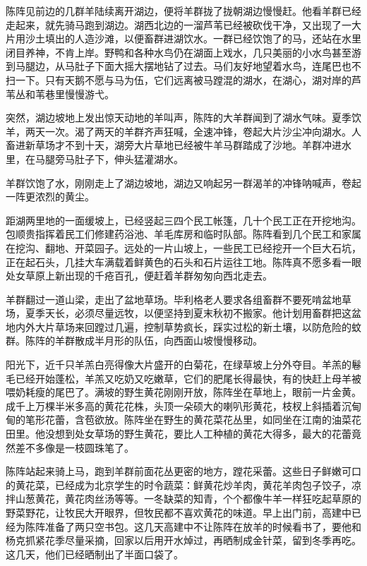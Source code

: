 \par 陈阵见前边的几群羊陆续离开湖边，便将羊群拢了拢朝湖边慢慢赶。他看羊群已经走起来，就先骑马跑到湖边。湖西北边的一溜芦苇已经被砍伐干净，又出现了一大片用沙土填出的人造沙滩，以便畜群进湖饮水。一群已经饮饱了的马，还站在水里闭目养神，不肯上岸。野鸭和各种水鸟仍在湖面上戏水，几只美丽的小水鸟甚至游到马腿边，从马肚子下面大摇大摆地钻了过去。马们友好地望着水鸟，连尾巴也不扫一下。只有天鹅不愿与马为伍，它们远离被马蹚混的湖水，在湖心，湖对岸的芦苇丛和苇巷里慢慢游弋。
\par 突然，湖边坡地上发出惊天动地的羊叫声，陈阵的大羊群闻到了湖水气味。夏季饮羊，两天一次。渴了两天的羊群齐声狂喊，全速冲锋，卷起大片沙尘冲向湖水。人畜进新草场才不到十天，湖旁大片草地已经被牛羊马群踏成了沙地。羊群冲进水里，在马腿旁马肚子下，伸头猛灌湖水。
\par 羊群饮饱了水，刚刚走上了湖边坡地，湖边又响起另一群渴羊的冲锋呐喊声，卷起一阵更浓烈的黄尘。
\par 距湖两里地的一面缓坡上，已经竖起三四个民工帐篷，几十个民工正在开挖地沟。包顺贵指挥着民工们修建药浴池、羊毛库房和临时队部。陈阵看到几个民工和家属在挖沟、翻地、开菜园子。远处的一片山坡上，一些民工已经挖开一个巨大石坑，正在起石头，几挂大车满载着鲜黄色的石头和石片运往工地。陈阵真不愿多看一眼处女草原上新出现的千疮百孔，便赶着羊群匆匆向西北走去。
\par 羊群翻过一道山梁，走出了盆地草场。毕利格老人要求各组畜群不要死啃盆地草场，夏季天长，必须尽量远牧，以便坚持到夏末秋初不搬家。他计划用畜群把这盆地内外大片草场来回蹚过几遍，控制草势疯长，踩实过松的新土壤，以防危险的蚊群。陈阵的羊群散成半月形的队伍，向西面山坡慢慢移动。
\par 阳光下，近千只羊羔白亮得像大片盛开的白菊花，在绿草坡上分外夺目。羊羔的鬈毛已经开始蓬松，羊羔又吃奶又吃嫩草，它们的肥尾长得最快，有的快赶上母羊被喂奶耗瘦的尾巴了。满坡的野生黄花刚刚开放，陈阵坐在草地上，眼前一片金黄。成千上万棵半米多高的黄花花株，头顶一朵硕大的喇叭形黄花，枝杈上斜插着沉甸甸的笔形花蕾，含苞欲放。陈阵坐在野生的黄花菜花丛里，如同坐在江南的油菜花田里。他没想到处女草场的野生黄花，要比人工种植的黄花大得多，最大的花蕾竟然差不多像是一枝圆珠笔了。
\par 陈阵站起来骑上马，跑到羊群前面花丛更密的地方，蹚花采蕾。这些日子鲜嫩可口的黄花菜，已经成为北京学生的时令蔬菜：鲜黄花炒羊肉，黄花羊肉包子饺子，凉拌山葱黄花，黄花肉丝汤等等。一冬缺菜的知青，个个都像牛羊一样狂吃起草原的野菜野花，让牧民大开眼界，但牧民都不喜欢黄花的味道。早上出门前，高建中已经为陈阵准备了两只空书包。这几天高建中不让陈阵在放羊的时候看书了，要他和杨克抓紧花季尽量采摘，回家以后用开水焯过，再晒制成金针菜，留到冬季再吃。这几天，他们已经晒制出了半面口袋了。
